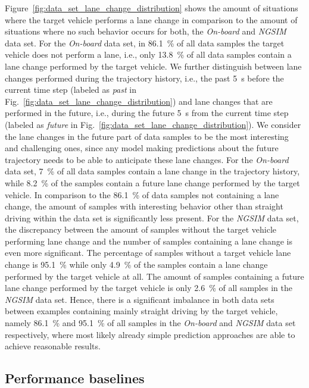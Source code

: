 Figure~\ref{fig:data_set_lane_change_distribution} shows the amount of situations where the target vehicle performs a lane change in comparison to the amount of situations where no such behavior occurs for both, the \emph{On-board} and \emph{\ac{NGSIM}} data set.
For the \emph{On-board} data set, in \SI{86.1}{\percent} of all data samples the target vehicle does not perform a lane, i.e., only \SI{13.8}{\percent} of all data samples contain a lane change performed by the target vehicle.
We further distinguish between lane changes performed during the trajectory history, i.e., the past \SI{5}{\second} before the current time step (labeled as \emph{past} in Fig.~\ref{fig:data_set_lane_change_distribution}) and lane changes that are performed in the future, i.e., during the future \SI{5}{\second} from the current time step (labeled as \emph{future} in Fig.~\ref{fig:data_set_lane_change_distribution}).
We consider the lane changes in the future part of data samples to be the most interesting and challenging ones, since any model making predictions about the future trajectory needs to be able to anticipate these lane changes.
For the \emph{On-board} data set, \SI{7}{\percent} of all data samples contain a lane change in the trajectory history, while \SI{8.2}{\percent} of the samples contain a future lane change performed by the target vehicle.
In comparison to the \SI{86.1}{\percent} of data samples not containing a lane change, the amount of samples with interesting behavior other than straight driving within the data set is significantly less present.
For the \emph{\ac{NGSIM}} data set, the discrepancy between the amount of samples without the target vehicle performing lane change and the number of samples containing a lane change is even more significant.
The percentage of samples without a target vehicle lane change is \SI{95.1}{\percent} while only \SI{4.9}{\percent} of the samples contain a lane change performed by the target vehicle at all.
The amount of samples containing a future lane change performed by the target vehicle is only \SI{2.6}{\percent} of all samples in the \emph{\ac{NGSIM}} data set.
Hence, there is a significant imbalance in both data sets between examples containing mainly straight driving by the target vehicle, namely \SI{86.1}{\percent} and \SI{95.1}{\percent} of all samples in the \emph{On-board} and \emph{\ac{NGSIM}} data set respectively, where most likely already simple prediction approaches are able to achieve reasonable results.

\subsection{Performance baselines}
\label{subsec:baselines}

